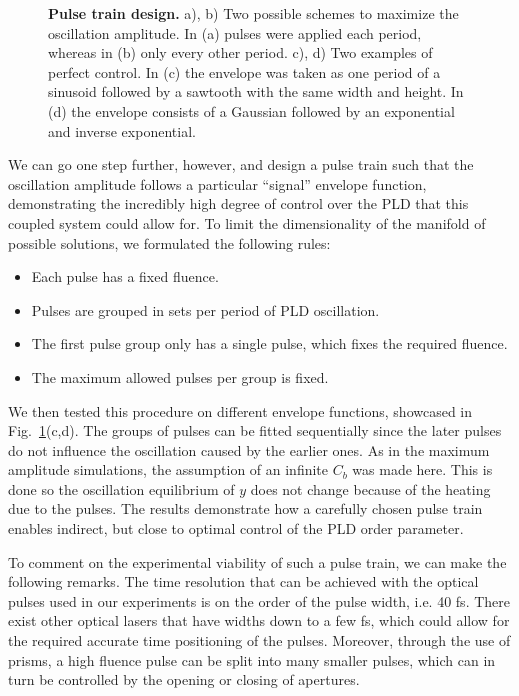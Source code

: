 \begin{figure}
	\caption{\label{fig:Cr_control} {\bf Pulse train design.} a), b) Two possible schemes to maximize the oscillation amplitude. In (a) pulses were applied each period, whereas in (b) only every other period. c), d) Two examples of perfect control. In (c) the envelope was taken as one period of a sinusoid followed by a sawtooth with the same width and height. In (d) the envelope consists of a Gaussian followed by an exponential and inverse exponential.}
\end{figure}
We can go one step further, however, and design a pulse train such that the oscillation amplitude follows a particular ``signal'' envelope function, demonstrating the incredibly high degree of control over the \gls{PLD} that this coupled system could allow for.  
To limit the dimensionality of the manifold of possible solutions, we formulated the following rules:
\begin{itemize}
	\item Each pulse has a fixed fluence.
	\item Pulses are grouped in sets per period of \gls{PLD} oscillation.
	\item The first pulse group only has a single pulse, which fixes the required fluence.
	\item The maximum allowed pulses per group is fixed.
\end{itemize}
We then tested this procedure on different envelope functions, showcased in Fig.~\ref{fig:Cr_control}(c,d).
The groups of pulses can be fitted sequentially since the later pulses do not influence the oscillation caused by the earlier ones.
As in the maximum amplitude simulations, the assumption of an infinite $C_b$ was made here.
This is done so the oscillation equilibrium of $y$ does not change because of the heating due to the pulses.
The results demonstrate how a carefully chosen pulse train enables indirect, but close to optimal control of the \gls{PLD} order parameter.

To comment on the experimental viability of such a pulse train, we can make the following remarks.
The time resolution that can be achieved with the optical pulses used in our experiments is on the order of the pulse width, i.e. 40 fs. There exist other optical lasers that have widths down to a few fs, which could allow for the required accurate time positioning of the pulses.
Moreover, through the use of prisms, a high fluence pulse can be split into many smaller pulses, which can in turn be controlled by the opening or closing of apertures.

